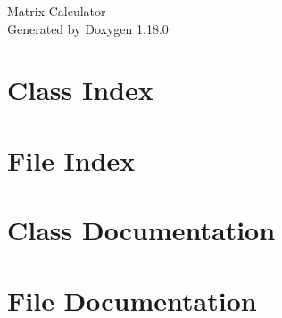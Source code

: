 \documentclass[twoside]{book}
\newcommand{\+}{\discretionary{\mbox{\scriptsize$\hookleftarrow$}}{}{}}
\newcommand{\clearemptydoublepage}{%
    \newpage{\pagestyle{empty}\cleardoublepage}%
  }
\begin{document}
  \raggedbottom
    \hypersetup{pageanchor=false,
                bookmarksnumbered=true,
                pdfencoding=unicode
               }
  \begin{titlepage}
  \vspace*{7cm}
  \begin{center}%
  {\Large Matrix Calculator}\\
  \vspace*{1cm}
  {\large Generated by Doxygen 1.18.0}\\
  \end{center}
  \end{titlepage}
  \clearemptydoublepage
  \tableofcontents
  \clearemptydoublepage
  \hypersetup{pageanchor=true}
\chapter{Class Index}

\chapter{File Index}

\chapter{Class Documentation}

\chapter{File Documentation}

  \backmatter
  \newpage
  \clearemptydoublepage
  \printindex
\end{document}
